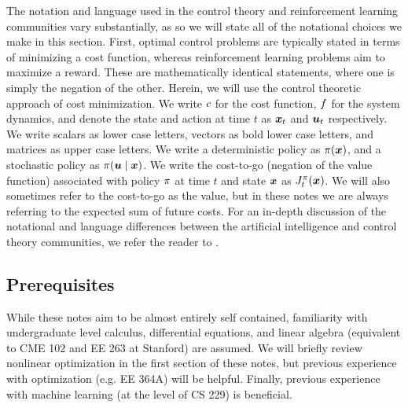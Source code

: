 The notation and language used in the control theory and reinforcement learning communities vary substantially, as so we will state all of the notational choices we make in this section. First, optimal control problems are typically stated in terms of minimizing a cost function, whereas reinforcement learning problems aim to maximize a reward. These are mathematically identical statements, where one is simply the negation of the other. Herein, we will use the control theoretic approach of cost minimization. We write $c$ for the cost function, $f$ for the system dynamics, and denote the state and action at time $t$ as $\bm{x}_t$ and $\bm{u}_t$ respectively. We write scalars as lower case letters, vectors as bold lower case letters, and matrices as upper case letters. We write a deterministic policy as $\pi(\bm{x})$, and a stochastic policy as $\pi(\bm{u}\mid\bm{x})$.
We write the cost-to-go (negation of the value function) associated with policy $\pi$ at time $t$ and state $\bm{x}$ as $J^\pi_t(\bm{x})$. We will also sometimes refer to the cost-to-go as the value, but in these notes we are always referring to the expected sum of future costs. 
For an in-depth discussion of the notational and language differences between the artificial intelligence and control theory communities, we refer the reader to \cite{powell2012ai}.

\subsection*{Prerequisites}

While these notes aim to be almost entirely self contained, familiarity with undergraduate level calculus, differential equations, and linear algebra (equivalent to CME 102 and EE 263 at Stanford) are assumed. We will briefly review nonlinear optimization in the first section of these notes, but previous experience with optimization (e.g. EE 364A) will be helpful. Finally, previous experience with machine learning (at the level of CS 229) is beneficial. 